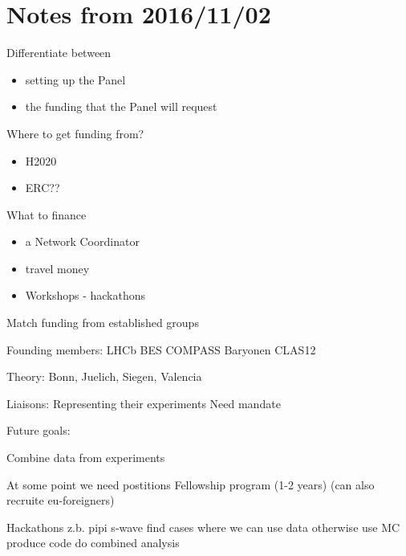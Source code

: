 \appendix
\section{Notes from 2016/11/02}
Differentiate between 
\begin{itemize}
\item setting up the Panel
\item the funding that the Panel will request
\end{itemize}

Where to get funding from?
\begin{itemize}
\item H2020
\item ERC??
\end{itemize}

What to finance
\begin{itemize}
\item a Network Coordinator
\item travel money
\item Workshops - hackathons
\end{itemize}

Match funding from established groups

Founding members:
LHCb
BES
COMPASS
Baryonen CLAS12

Theory: Bonn, Juelich, Siegen, Valencia 



Liaisons:
Representing their experiments
Need mandate


Future goals:

Combine data from experiments

At some point we need postitions
Fellowship program (1-2 years) (can also recruite eu-foreigners)

Hackathons
z.b. pipi s-wave
find cases where we can use data
otherwise use MC
produce code
do combined analysis


